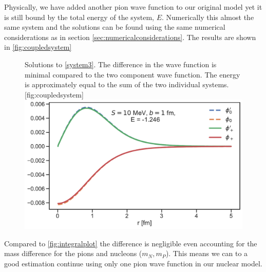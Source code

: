 Physically, we have added another pion wave function to our original model yet it is still bound by the total energy of the system, $E$. Numerically this almost the same system and the solutions can be found using the same numerical considerations as in section \ref{sec:numericalconsiderations}. The results are shown in \ref{fig:coupledsystem}
\begin{figure}[H]
    \begin{sidecaption}{Solutions to \eqref{system3}. The difference in the wave function is minimal compared to the two component wave function. The energy is approximately equal to the sum of the two individual systems.}[fig:coupledsystem]
    \includegraphics[width=\linewidth]{Figures/Integralplot_CoupledSystem.pdf}
    \end{sidecaption}
\end{figure}
Compared to \ref{fig:integralplot} the difference is negligible even accounting for the mass difference for the pions and nucleons ($m_N, m_P$). This means we can to a good estimation continue using only one pion wave function in our nuclear model. 
